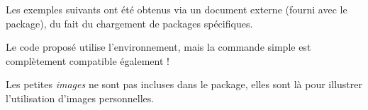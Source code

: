 \documentclass[french,11pt,a4paper]{article}
\begin{document}
Les exemples suivants ont été obtenus via un document externe (fourni avec le package), du fait du chargement de packages spécifiques.

Le code proposé utilise l'environnement, mais la commande simple est complètement compatible également !

\smallskip

{\footnotesize\faExclamationTriangle} Les petites \textit{images} ne sont pas incluses dans le package, elles sont là pour illustrer l'utilisation d'images personnelles.


\pagebreak
\end{document}

